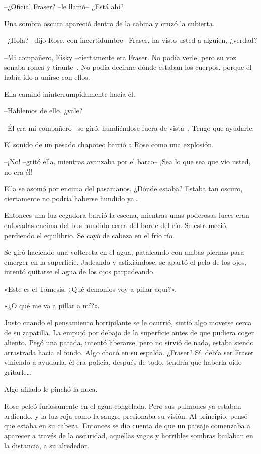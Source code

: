 {--¿Oficial Fraser? --le llamó-- ¿Está ahí?}

{Una sombra oscura apareció dentro de la cabina y cruzó la cubierta.}

{--¿Hola? --dijo Rose, con incertidumbre-- Fraser, ha visto usted a
alguien, ¿verdad?}

{--Mi compañero, Fisky --ciertamente era Fraser. No podía verle, pero su
 voz sonaba ronca y tirante--. No podía decirme dónde estaban los
cuerpos, porque él había ido a unirse con ellos.}

{Ella caminó ininterrumpidamente hacia él.}

{--Hablemos de ello, ¿vale?}

{--Él era mi compañero --se giró, hundiéndose fuera de vista--. Tengo
que ayudarle.}

{El sonido de un pesado chapoteo barrió a Rose como una explosión.}

{--¡No! --gritó ella, mientras avanzaba por el barco-- ¡Sea lo que sea
que vio usted, no era él!}

{Ella se asomó por encima del pasamanos. ¿Dónde estaba? Estaba tan
 oscuro, ciertamente no podría haberse hundido ya\ldots{}}

{Entonces una luz cegadora barrió la escena, mientras unas poderosas
 luces eran enfocadas encima del bus hundido cerca del borde del río. Se
estremeció, perdiendo el equilibrio. Se cayó de cabeza en el frío río.}

{Se giró haciendo una voltereta en el agua, pataleando con ambas piernas
 para emerger en la superficie. Jadeando y asfixiándose, se apartó el
pelo de los ojos, intentó quitarse el agua de los ojos parpadeando.}

{«Este es el Támesis. ¿Qué demonios voy a pillar aquí?».}

{«¿O qué me va a pillar a mí?».}

{Justo cuando el pensamiento horripilante se le ocurrió, sintió algo
 moverse cerca de su zapatilla. La empujó por debajo de la superficie
 antes de que pudiera coger aliento. Pegó una patada, intentó liberarse,
 pero no sirvió de nada, estaba siendo arrastrada hacia el fondo. Algo
 chocó en su espalda. ¿Fraser? Sí, debía ser Fraser viniendo a ayudarla,
 él era policía, después de todo, tendría que haberla oído
 gritarle\ldots{}}

{Algo afilado le pinchó la nuca.}

{Rose peleó furiosamente en el agua congelada. Pero sus pulmones ya
 estaban ardiendo, y la luz roja como la sangre presionaba su visión. Al
 principio, pensó que estaba en su cabeza. Entonces se dio cuenta de que
 un paisaje comenzaba a aparecer a través de la oscuridad, aquellas vagas
y horribles sombras bailaban en la distancia, a su alrededor.}


